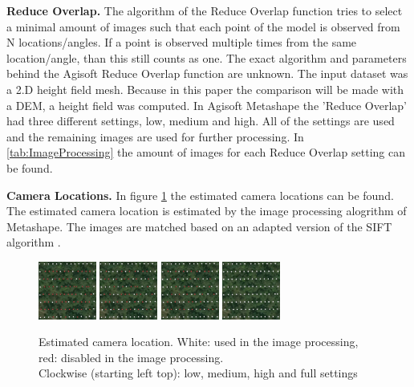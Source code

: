 \documentclass{isprs} %
\begin{document}
\textbf{Reduce Overlap.} 
The algorithm of the Reduce Overlap function tries to select a minimal amount of images such that each point of the model is observed from N locations/angles.
If a point is observed multiple times from the same location/angle, than this still counts as one. 
The exact algorithm and parameters behind the Agisoft Reduce Overlap function are unknown.
The input dataset was a 2.D height field mesh. 
Because in this paper the comparison will be made with a DEM, a height field was computed.
In Agisoft Metashape the 'Reduce Overlap' had three different settings, low, medium and high. 
All of the settings are used and the remaining images are used for further processing.
In \ref{tab:ImageProcessing} the amount of images for each Reduce Overlap setting can be found.

\textbf{Camera Locations.}
In figure \ref{fig:cameralocation} the estimated camera locations can be found. The estimated camera location is estimated by the image processing alogrithm of Metashape.
The images are matched based on an adapted version of the SIFT algorithm \citep{lowe1999object, AgisoftMetashape}. 

\begin{figure}[h]
    \centering
    \includegraphics[width=1.9cm]{loc_low.png}
    \includegraphics[width=1.9cm]{loc_med.png}
    \includegraphics[width=1.9cm]{loc_high.png}
    \includegraphics[width=1.9cm]{loc_full.png}
    \caption{Estimated camera location. 
    White: used in the image processing, red: disabled in the image processing.\\
    Clockwise (starting left top): low, medium, high and full settings}
    \label{fig:cameralocation}
\end{figure}
\end{document}
